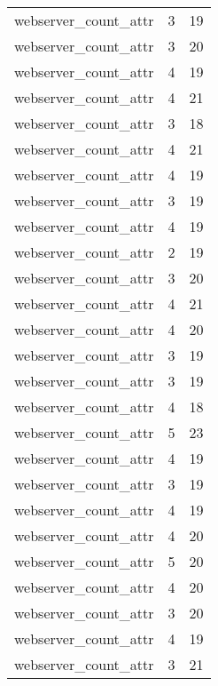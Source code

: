 \begin{table}
\begin{tabular}{lrr}
            webserver\_count\_attr &         3 &        19 \\
            webserver\_count\_attr &         3 &        20 \\
            webserver\_count\_attr &         4 &        19 \\
            webserver\_count\_attr &         4 &        21 \\
            webserver\_count\_attr &         3 &        18 \\
            webserver\_count\_attr &         4 &        21 \\
            webserver\_count\_attr &         4 &        19 \\
            webserver\_count\_attr &         3 &        19 \\
            webserver\_count\_attr &         4 &        19 \\
            webserver\_count\_attr &         2 &        19 \\
            webserver\_count\_attr &         3 &        20 \\
            webserver\_count\_attr &         4 &        21 \\
            webserver\_count\_attr &         4 &        20 \\
            webserver\_count\_attr &         3 &        19 \\
            webserver\_count\_attr &         3 &        19 \\
            webserver\_count\_attr &         4 &        18 \\
            webserver\_count\_attr &         5 &        23 \\
            webserver\_count\_attr &         4 &        19 \\
            webserver\_count\_attr &         3 &        19 \\
            webserver\_count\_attr &         4 &        19 \\
            webserver\_count\_attr &         4 &        20 \\
            webserver\_count\_attr &         5 &        20 \\
            webserver\_count\_attr &         4 &        20 \\
            webserver\_count\_attr &         3 &        20 \\
            webserver\_count\_attr &         4 &        19 \\
            webserver\_count\_attr &         3 &        21 \\

\end{tabular}
\end{table}

